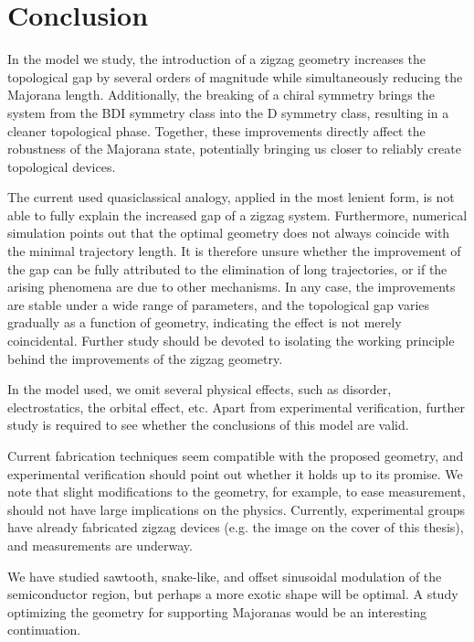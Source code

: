 \chapter{Conclusion}
In the model we study, the introduction of a zigzag geometry increases the topological gap by several orders of magnitude while simultaneously reducing the Majorana length.
Additionally, the breaking of a chiral symmetry brings the system from the BDI symmetry class into the D symmetry class, resulting in a cleaner topological phase.  %
Together, these improvements directly affect the robustness of the Majorana state, potentially bringing us closer to reliably create topological devices.

The current used quasiclassical analogy, applied in the most lenient form, is not able to fully explain the increased gap of a zigzag system.
Furthermore, numerical simulation points out that the optimal geometry does not always coincide with the minimal trajectory length.
It is therefore unsure whether the improvement of the gap can be fully attributed to the elimination of long trajectories, or if the arising phenomena are due to other mechanisms.
In any case, the improvements are stable under a wide range of parameters, and the topological gap varies gradually as a function of geometry, indicating the effect is not merely coincidental.
Further study should be devoted to isolating the working principle behind the improvements of the zigzag geometry.

In the model used, we omit several physical effects, such as disorder, electrostatics, the orbital effect, etc.  %
Apart from experimental verification, further study is required to see whether the conclusions of this model are valid.  %

Current fabrication techniques seem compatible with the proposed geometry, and experimental verification should point out whether it holds up to its promise.
We note that slight modifications to the geometry, for example, to ease measurement, should not have large implications on the physics.
Currently, experimental groups have already fabricated zigzag devices (e.g. the image on the cover of this thesis), and measurements are underway.

We have studied sawtooth, snake-like, and offset sinusoidal modulation of the semiconductor region, but perhaps a more exotic shape will be optimal. %
A study optimizing the geometry for supporting Majoranas would be an interesting continuation.
